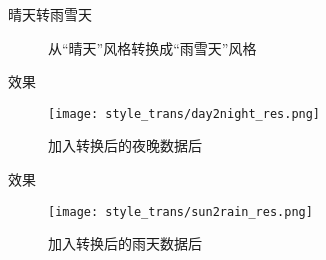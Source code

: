 \documentclass[hyperref={unicode=true}]{beamer}
\theoremstyle{definition}
\theoremstyle{proof}
\begin{document}
\begin{frame}{晴天转雨雪天}
  \begin{figure}[htbp]
    \caption{从“晴天”风格转换成“雨雪天”风格}
    \label{fig:sun2rain}
  \end{figure}
\end{frame}

\begin{frame}{效果}
  \begin{figure}[!h]
    \centering
    \texttt{[image: style\_trans/day2night\_res.png]}
    \caption{加入转换后的夜晚数据后}
    \label{fig:day2night_res}
  \end{figure}
\end{frame}

\begin{frame}{效果}
  \begin{figure}[!h]
    \centering
    \texttt{[image: style\_trans/sun2rain\_res.png]}
    \caption{加入转换后的雨天数据后}
    \label{fig:sun2rain_res}
  \end{figure}
\end{frame}

\begin{frame}\frametitle{}
  \vspace{0.2in}
\end{frame}

\end{document}

